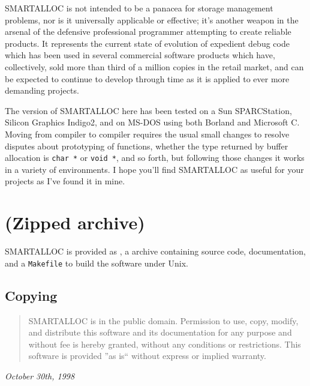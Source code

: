 SMARTALLOC is not intended to be a panacea for storage management problems,
nor is it universally applicable or effective; it's another weapon in the
arsenal of the defensive professional programmer attempting to create reliable
products. It represents the current state of evolution of expedient debug code
which has been used in several commercial software products which have,
collectively, sold more than third of a million copies in the retail market,
and can be expected to continue to develop through time as it is applied to
ever more demanding projects.

The version of SMARTALLOC here has been tested on a Sun SPARCStation, Silicon
Graphics Indigo2, and on MS-DOS using both Borland and Microsoft C. Moving
from compiler to compiler requires the usual small changes to resolve disputes
about prototyping of functions, whether the type returned by buffer allocation
is {\tt char\ *} or {\tt void\ *}, and so forth, but following those changes
it works in a variety of environments. I hope you'll find SMARTALLOC as useful
for your projects as I've found it in mine.

\section{
(Zipped archive)}

SMARTALLOC is provided as
, a
 archive containing  source code,
documentation, and a  {\tt Makefile} to build the software under Unix.

\subsection{ Copying}

\begin{quote}
SMARTALLOC is in the public domain. Permission to use, copy, modify, and
distribute this software and its documentation for any purpose and without fee
is hereby granted, without any conditions or restrictions. This software is
provided ''as is`` without express or implied warranty.
\end{quote}

{\it
{}
October 30th, 1998 }
